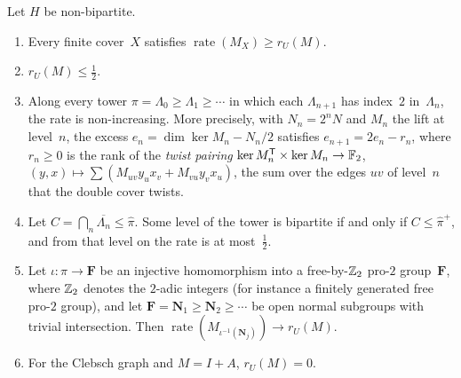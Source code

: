 \begin{theorem}\label{thm:eqcrux}
Let $H$ be non-bipartite.
\begin{enumerate}[label=(\alph*)]
\item Every finite cover~$X$ satisfies $\operatorname{rate}(M_X)\ge r_U(M)$.
\item $r_U(M)\le\frac12$.
\item Along every tower $\pi=\Lambda_0\ge\Lambda_1\ge\cdots$ in which each $\Lambda_{n+1}$ has index~$2$ in~$\Lambda_n$, the rate
is non-increasing. More precisely, with $N_n=2^nN$ and $M_n$ the lift at level~$n$, the excess $e_n=\dim\ker M_n-N_n/2$
satisfies $e_{n+1}=2e_n-r_n$, where $r_n\ge0$ is the rank of the \emph{twist pairing}
$\ker M_n^{\mathsf{T}}\times\ker M_n\to\mathbb{F}_2$, $(y,x)\mapsto\sum(M_{uv}y_ux_v+M_{vu}y_vx_u)$, the sum over the edges $uv$ of level~$n$
that the double cover twists.
\item Let $C=\bigcap_n\overline{\Lambda_n}\le\hat\pi$. Some level of the tower is bipartite if and only if $C\le\hat\pi^+$, and
from that level on the rate is at most~$\frac12$.
\item Let $\iota\colon\pi\to\mathbf F$ be an injective homomorphism into a free-by-$\mathbb{Z}_2$ pro-$2$ group~$\mathbf F$, where
$\mathbb{Z}_2$ denotes the $2$-adic integers (for instance a finitely generated free pro-$2$ group), and let
$\mathbf F=\mathbf N_1\ge\mathbf N_2\ge\cdots$ be open normal subgroups with trivial intersection. Then
$\operatorname{rate}(M_{\iota^{-1}(\mathbf N_j)})\to r_U(M)$.
\item For the Clebsch graph and $M=I+A$, $r_U(M)=0$.
\end{enumerate}
\end{theorem}

